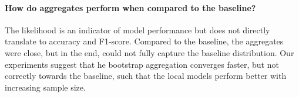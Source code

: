 \paragraph*{How do aggregates perform when compared to the baseline?}
The likelihood is an indicator of model performance but does not directly translate to accuracy and F1-score.
Compared to the baseline, the aggregates were close, but in the end, could not fully capture the baseline distribution.
Our experiments suggest that he bootstrap aggregation converges faster, but not correctly towards the baseline, such that the local models perform better with increasing sample size.



   